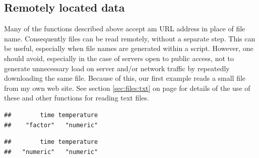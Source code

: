 \documentclass[krantz2,ChapterTOCs]{krantz}\usepackage{knitr}
\begin{document}
\subsection{Remotely located data}\label{sec:files:remote}

Many of the functions described above accept am URL address in place of file name. Consequently files can be read remotely, without a separate step. This can be useful, especially when file names are generated within a script. However, one should avoid, especially in the case of servers open to public access, not to generate unnecessary load on server and/or network traffic by repeatedly downloading the same file. Because of this, our first example reads a small file from my own web site. See section \ref{sec:files:txt} on page \pageref{sec:files:txt} for details of the use of these and other functions for reading text files.

\begin{knitrout}\footnotesize
{}\color{fgcolor}\begin{kframe}
\begin{alltt}
 \hlkwb{<-}
      \hlstd{(} \hlstd{=} \hlstd{,}
                 \hlstd{=} \hlstd{,}
                 \hlstd{=} \hlstd{(}\hlstd{,} \hlstd{))}
\end{alltt}
\begin{verbatim}
##        time temperature 
##    "factor"   "numeric"
\end{verbatim}
\begin{alltt}
\end{alltt}
\begin{verbatim}
##        time temperature 
##   "numeric"   "numeric"
\end{verbatim}
\end{kframe}
\end{knitrout}
\end{document}

